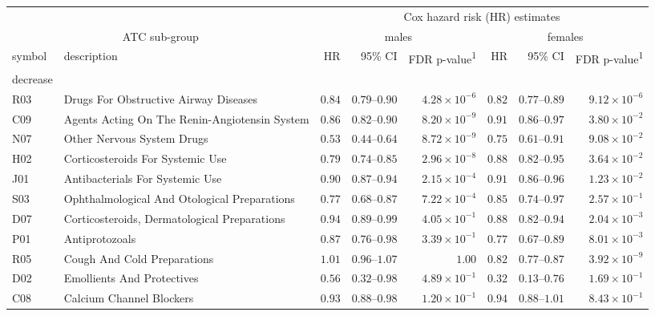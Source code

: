 \captionsetup[table]{labelformat=empty,skip=1pt}
\setlength{\LTpost}{0mm}
\begin{longtable}{llrrrrrr}
\toprule
 &  & \multicolumn{6}{c}{Cox hazard risk (HR) estimates} \\ 
\cmidrule(lr){3-8}
\multicolumn{2}{c}{ATC sub-group} & \multicolumn{3}{c}{males} & \multicolumn{3}{c}{females} \\ 
\cmidrule(lr){1-2} \cmidrule(lr){3-5} \cmidrule(lr){6-8}
symbol & description & HR & 95\% CI & FDR p-value\textsuperscript{1} & HR & 95\% CI & FDR p-value\textsuperscript{1} \\ 
\midrule
\multicolumn{1}{l}{decrease} \\ 
\midrule
R03 & Drugs For Obstructive Airway Diseases & $0.84$ & $0.79$–$0.90$ & $4.28 \times 10^{-6}$ & $0.82$ & $0.77$–$0.89$ & $9.12 \times 10^{-6}$ \\ 
C09 & Agents Acting On The Renin-Angiotensin System & $0.86$ & $0.82$–$0.90$ & $8.20 \times 10^{-9}$ & $0.91$ & $0.86$–$0.97$ & $3.80 \times 10^{-2}$ \\ 
N07 & Other Nervous System Drugs & $0.53$ & $0.44$–$0.64$ & $8.72 \times 10^{-9}$ & $0.75$ & $0.61$–$0.91$ & $9.08 \times 10^{-2}$ \\ 
H02 & Corticosteroids For Systemic Use & $0.79$ & $0.74$–$0.85$ & $2.96 \times 10^{-8}$ & $0.88$ & $0.82$–$0.95$ & $3.64 \times 10^{-2}$ \\ 
J01 & Antibacterials For Systemic Use & $0.90$ & $0.87$–$0.94$ & $2.15 \times 10^{-4}$ & $0.91$ & $0.86$–$0.96$ & $1.23 \times 10^{-2}$ \\ 
S03 & Ophthalmological And Otological Preparations & $0.77$ & $0.68$–$0.87$ & $7.22 \times 10^{-4}$ & $0.85$ & $0.74$–$0.97$ & $2.57 \times 10^{-1}$ \\ 
D07 & Corticosteroids, Dermatological Preparations & $0.94$ & $0.89$–$0.99$ & $4.05 \times 10^{-1}$ & $0.88$ & $0.82$–$0.94$ & $2.04 \times 10^{-3}$ \\ 
P01 & Antiprotozoals & $0.87$ & $0.76$–$0.98$ & $3.39 \times 10^{-1}$ & $0.77$ & $0.67$–$0.89$ & $8.01 \times 10^{-3}$ \\ 
R05 & Cough And Cold Preparations & $1.01$ & $0.96$–$1.07$ & $1.00$ & $0.82$ & $0.77$–$0.87$ & $3.92 \times 10^{-9}$ \\ 
D02 & Emollients And Protectives & $0.56$ & $0.32$–$0.98$ & $4.89 \times 10^{-1}$ & $0.32$ & $0.13$–$0.76$ & $1.69 \times 10^{-1}$ \\ 
C08 & Calcium Channel Blockers & $0.93$ & $0.88$–$0.98$ & $1.20 \times 10^{-1}$ & $0.94$ & $0.88$–$1.01$ & $8.43 \times 10^{-1}$ \\ 

\end{longtable}
